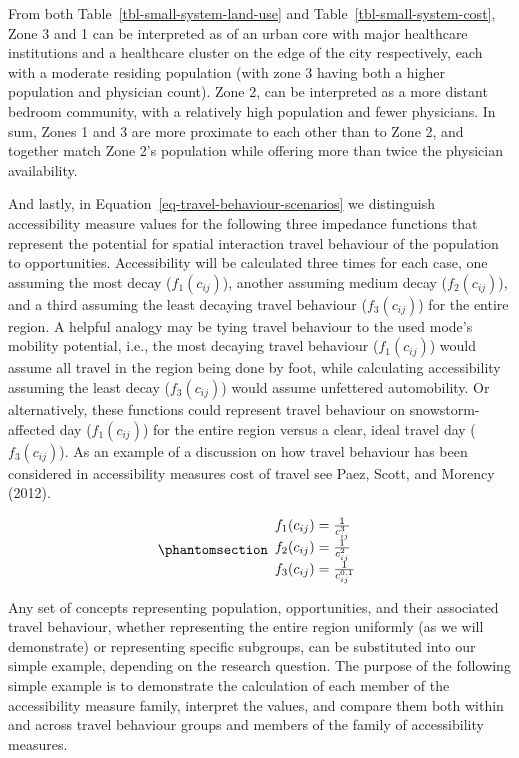 \documentclass[
]{article}
\begin{document}
From both Table~\ref{tbl-small-system-land-use} and
Table~\ref{tbl-small-system-cost}, Zone 3 and 1 can be interpreted as of
an urban core with major healthcare institutions and a healthcare
cluster on the edge of the city respectively, each with a moderate
residing population (with zone 3 having both a higher population and
physician count). Zone 2, can be interpreted as a more distant bedroom
community, with a relatively high population and fewer physicians. In
sum, Zones 1 and 3 are more proximate to each other than to Zone 2, and
together match Zone 2's population while offering more than twice the
physician availability.

And lastly, in Equation~\ref{eq-travel-behaviour-scenarios} we
distinguish accessibility measure values for the following three
impedance functions that represent the potential for spatial interaction
travel behaviour of the population to opportunities. Accessibility will
be calculated three times for each case, one assuming the most decay
(\(f_1(c_{ij})\)), another assuming medium decay (\(f_2(c_{ij})\)), and
a third assuming the least decaying travel behaviour (\(f_3(c_{ij})\))
for the entire region. A helpful analogy may be tying travel behaviour
to the used mode's mobility potential, i.e., the most decaying travel
behaviour (\(f_1(c_{ij})\)) would assume all travel in the region being
done by foot, while calculating accessibility assuming the least decay
(\(f_3(c_{ij})\)) would assume unfettered automobility. Or
alternatively, these functions could represent travel behaviour on
snowstorm-affected day (\(f_1(c_{ij})\)) for the entire region versus a
clear, ideal travel day (\(f_3(c_{ij})\)). As an example of a discussion
on how travel behaviour has been considered in accessibility measures
cost of travel see Paez, Scott, and Morency (2012).

\begin{equation}\phantomsection\label{eq-travel-behaviour-scenarios}{
\begin{array}{l}
f_1(c_{ij}) = \frac{1}{c_{ij}^3}\\
f_2(c_{ij}) = \frac{1}{c_{ij}^2}\\
f_3(c_{ij}) = \frac{1}{c_{ij}^{0.1}}
\end{array}
}\end{equation}

Any set of concepts representing population, opportunities, and their
associated travel behaviour, whether representing the entire region
uniformly (as we will demonstrate) or representing specific subgroups,
can be substituted into our simple example, depending on the research
question. The purpose of the following simple example is to demonstrate
the calculation of each member of the accessibility measure family,
interpret the values, and compare them both within and across travel
behaviour groups and members of the family of accessibility measures.
\end{document}

